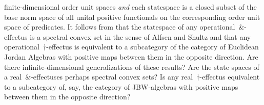 \begin{parsec}
\begin{point}
\begin{point}
        finite-dimensional order unit spaces
        \emph{and} each statespace is a closed subset
        of the base norm space of all
        unital positive functionals on the corresponding
        order unit space of predicates.
It follows from \cite{wetering}
    that the statespace of any operational~$\&$-effectus
    is a spectral convex set in the sense of Alfsen and Shultz
    and that any operational~$\dagger$-effectus
    is equivalent to a subcategory of the category of Euclidean Jordan Algebras
    with positive maps between them in the opposite direction.
Are there infinite-dimensional generalizations of these results?
Are the state spaces of a real~$\&$-effectuses perhaps
    spectral convex sets?
Is any real~$\dagger$-effectus equivalent to a subcategory of, say,
    the category of JBW-algebras with positive maps between them
        in the opposite direction?
\end{point}
\end{point}
\end{parsec}


